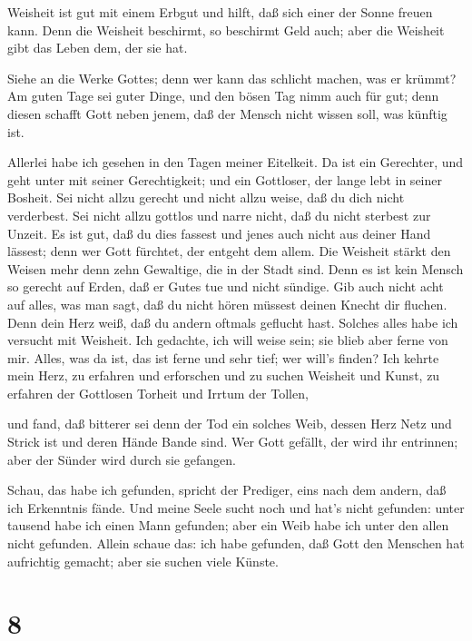  Weisheit ist gut mit einem Erbgut und hilft, daß sich
einer der Sonne freuen kann.  Denn die Weisheit beschirmt,
so beschirmt Geld auch; aber die Weisheit gibt das Leben dem, der sie
hat.

 Siehe an die Werke Gottes; denn wer kann das schlicht
machen, was er krümmt?  Am guten Tage sei guter Dinge, und
den bösen Tag nimm auch für gut; denn diesen schafft Gott neben jenem,
daß der Mensch nicht wissen soll, was künftig ist.

 Allerlei habe ich gesehen in den Tagen meiner Eitelkeit.
Da ist ein Gerechter, und geht unter mit seiner Gerechtigkeit; und ein
Gottloser, der lange lebt in seiner Bosheit.  Sei nicht
allzu gerecht und nicht allzu weise, daß du dich nicht verderbest.
 Sei nicht allzu gottlos und narre nicht, daß du nicht
sterbest zur Unzeit.  Es ist gut, daß du dies fassest und
jenes auch nicht aus deiner Hand lässest; denn wer Gott fürchtet, der
entgeht dem allem.  Die Weisheit stärkt den Weisen mehr
denn zehn Gewaltige, die in der Stadt sind.  Denn es ist
kein Mensch so gerecht auf Erden, daß er Gutes tue und nicht sündige.
 Gib auch nicht acht auf alles, was man sagt, daß du nicht
hören müssest deinen Knecht dir fluchen.  Denn dein Herz
weiß, daß du andern oftmals geflucht hast.  Solches alles
habe ich versucht mit Weisheit. Ich gedachte, ich will weise sein; sie
blieb aber ferne von mir.  Alles, was da ist, das ist ferne
und sehr tief; wer will's finden?  Ich kehrte mein Herz, zu
erfahren und erforschen und zu suchen Weisheit und Kunst, zu erfahren
der Gottlosen Torheit und Irrtum der Tollen,

 und fand, daß bitterer sei denn der Tod ein solches Weib,
dessen Herz Netz und Strick ist und deren Hände Bande sind. Wer Gott
gefällt, der wird ihr entrinnen; aber der Sünder wird durch sie
gefangen.

 Schau, das habe ich gefunden, spricht der Prediger, eins
nach dem andern, daß ich Erkenntnis fände.  Und meine Seele
sucht noch und hat's nicht gefunden: unter tausend habe ich einen Mann
gefunden; aber ein Weib habe ich unter den allen nicht gefunden.
 Allein schaue das: ich habe gefunden, daß Gott den
Menschen hat aufrichtig gemacht; aber sie suchen viele Künste.

\hypertarget{section-7}{%
\section{8}\label{section-7}}

